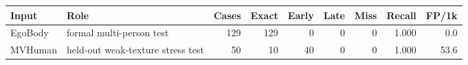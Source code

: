 \begin{tabular}{llrrrrrrr}
\toprule
Input & Role & Cases & Exact & Early & Late & Miss & Recall & FP/1k \\
\midrule
EgoBody & formal multi-person test & 129 & 129 & 0 & 0 & 0 & 1.000 & 0.0 \\
MVHuman & held-out weak-texture stress test & 50 & 10 & 40 & 0 & 0 & 1.000 & 53.6 \\
\bottomrule
\end{tabular}

